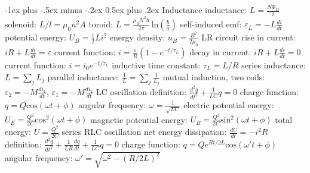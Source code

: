 \documentclass[10pt,landscape]{article}
\makeatletter
\renewcommand{\subsection}{\@startsection{subsection}{2}{0mm}%
                                {-1ex plus -.5ex minus -.2ex}%
                                {0.5ex plus .2ex}%
                                {\normalfont\normalsize\bfseries}}
\newcommand{\spc}{\hspace*{1em}}
\makeatother
\begin{document}
\begin{multicols}{3}
\subsection{Inductance}
inductance: $L=\frac{N\Phi _B}{i}$
\newline
\spc solenoid: $L/l=\mu _0n^2A$
\newline
\spc toroid: $L=\frac{\mu _0N^2h}{2\pi} \, \mathrm{ln}(\frac{b}{a})$
\newline
self-induced emf: $\varepsilon _L=-L\frac{di}{dt}$
\newline
potential energy: $U_B=\frac{1}{2}Li^2$
\newline
energy density: $u_B=\frac{B^2}{2\mu _0}$
\newline \newline
LR circuit
\newline
\spc rise in current: $iR+L\frac{di}{dt}=\varepsilon $
\newline
\spc\spc current function: $i=\frac{\varepsilon }{R}(1-e^{-t/\tau _L})$
\newline
\spc decay in current: $iR+L\frac{di}{dt}=0$
\newline
\spc\spc current function: $i=i_0e^{-t/\tau _L}$
\newline
\spc inductive time constant: $\tau _L=L/R$
\newline \newline
series inductance: $L=\sum _j L_j$
\newline
parallel inductance: $\frac{1}{L}=\sum _j \frac{1}{L_j}$
\newline
mutual induction, two coils: 
\newline
\spc $\varepsilon _2=-M\frac{di_1}{dt}$, $\varepsilon _1=-M\frac{di_2}{dt}$
\newline \newline
LC oscillation
\newline
\spc definition: $\frac{d^2q}{dt^2}+\frac{1}{LC}q=0$
\newline
\spc\spc charge function: $q=Q\mathrm{cos}(\omega t+\phi)$
\newline
\spc angular frequency: $\omega =\frac{1}{\sqrt{LC}}$
\newline
\spc electric potential energy: $U_E=\frac{Q^2}{2C}\mathrm{cos}^2(\omega t+\phi)$
\newline
\spc magnetic potential energy: $U_B=\frac{Q^2}{2C}\mathrm{sin}^2(\omega t+\phi)$
\newline
\spc total energy: $U=\frac{Q^2}{2C}$
\newline \newline
series RLC oscillation
\newline
\spc net energy dissipation: $\frac{dU}{dt}=-i^2R$
\newline
\spc definition: $\frac{d^2q}{dt^2}+\frac{1}{LR}\frac{dq}{dt}+\frac{1}{LC}q=0$
\newline
\spc \spc charge function: $q=Qe^{Rt/2L}\mathrm{cos}(\omega 't+\phi)$
\newline
\spc angular frequency: $\omega '=\sqrt{\omega ^2-(R/2L)^2}$


\end{multicols}
\end{document}
